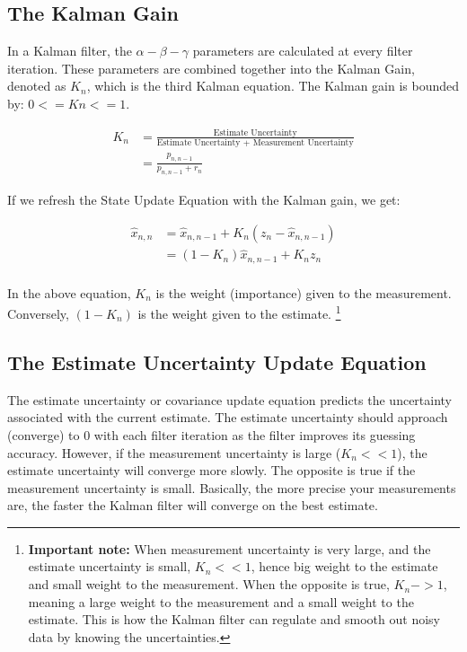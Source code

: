 \subsection{The Kalman Gain} In a Kalman filter, the $\alpha-\beta-\gamma$ parameters are calculated at every filter iteration.
These parameters are combined together into the Kalman Gain, denoted as $K_n$, which is the third Kalman equation.
The Kalman gain is bounded by: $0 <= Kn <= 1$.

\begin{equation} \label{eq:kalman_gain}
    \begin{aligned}
        K_n &= \frac{\text{Estimate Uncertainty}}{\text{Estimate Uncertainty + Measurement Uncertainty}} \\
            &= \frac{p_{n,n-1}}{p_{n,n-1} + r_n}
    \end{aligned}
\end{equation}

If we refresh the State Update Equation with the Kalman gain, we get:

\begin{equation} \label{eq:kalman_state_update}
    \begin{aligned}
        \hat{x}_{n,n} &= \hat{x}_{n,n-1} + K_n(z_n - \hat{x}_{n,n-1}) \\
                        &= (1-K_n)\hat{x}_{n,n-1} + K_n z_n \\
    \end{aligned}
\end{equation}

In the above equation, $K_n$ is the weight (importance) given to the measurement.
Conversely, $(1-K_n)$ is the weight given to the estimate. \footnote[1]{\textbf{Important note:} When measurement uncertainty is very large, and the estimate uncertainty is small, $K_n << 1$, hence big weight to the estimate and small weight to the measurement. When the opposite is true, $K_n -> 1$, meaning a large weight to the measurement and a small weight to the estimate. This is how the Kalman filter can regulate and smooth out noisy data by knowing the uncertainties.}

\subsection{The Estimate Uncertainty Update Equation} 
The estimate uncertainty or covariance update equation predicts the uncertainty associated with the current estimate.
The estimate uncertainty should approach (converge) to 0 with each filter iteration as the filter improves its guessing accuracy.
However, if the measurement uncertainty is large ($K_n << 1$), the estimate uncertainty will converge more slowly.
The opposite is true if the measurement uncertainty is small.
Basically, the more precise your measurements are, the faster the Kalman filter will converge on the best estimate.

